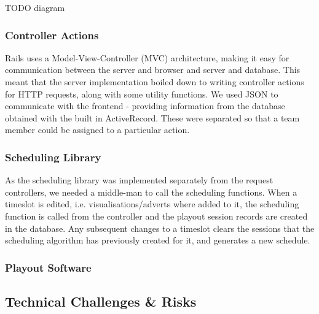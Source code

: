 \documentclass[a4paper, titlepage]{article}
\begin{document}
TODO diagram



\subsubsection{Controller Actions}

Rails uses a Model-View-Controller (MVC) architecture, making it easy for communication between the 
server and browser and server and database. This meant that the server implementation boiled down to
writing controller actions for HTTP requests, along with some utility functions. We used JSON to 
communicate with the frontend - providing information from the database obtained with the built in 
ActiveRecord. These were separated so that a team member could be assigned to a particular action.   



\subsubsection{Scheduling Library}


As the scheduling library was implemented separately from the request controllers,
we needed a middle-man to call the scheduling functions. When a timeslot is edited, i.e. 
visualisations/adverts where added to it, the scheduling function is called from
the controller and the playout session records are created in the database. Any 
subsequent changes to a timeslot clears the sessions that the scheduling algorithm 
has previously created for it, and generates a new schedule. 

\subsubsection{Playout Software}




\subsection{Technical Challenges \& Risks}
\end{document}
